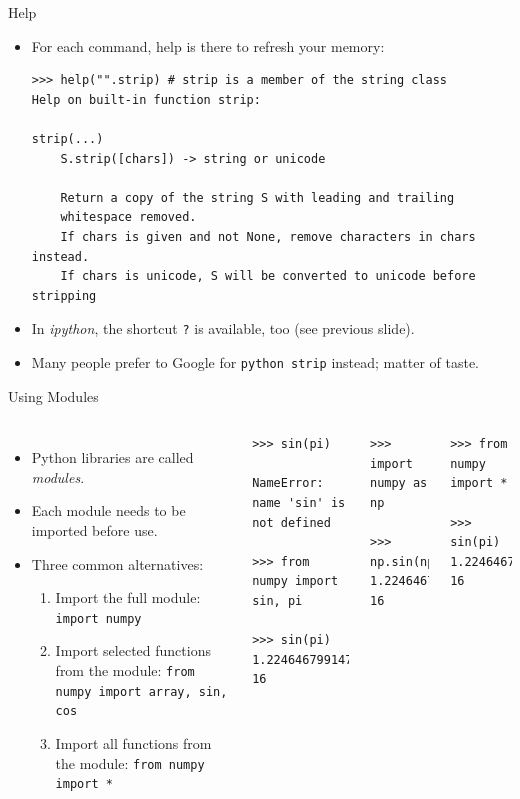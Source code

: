 \documentclass[10pt, aspectratio=169]{beamer} %
\begin{document}
\begin{frame}[fragile,allowframebreaks=0.8]
 {Help}
\begin{itemize}
\item For each command, help is there to refresh your memory:
\begin{lstlisting}
>>> help("".strip) # strip is a member of the string class
Help on built-in function strip:

strip(...)
    S.strip([chars]) -> string or unicode
    
    Return a copy of the string S with leading and trailing
    whitespace removed.
    If chars is given and not None, remove characters in chars instead.
    If chars is unicode, S will be converted to unicode before stripping
\end{lstlisting}
\item In \emph{ipython}, the shortcut \verb+?+ is available, too (see previous slide).
\item Many people prefer to Google for \verb+python strip+ instead; matter of taste.
\end{itemize}
\end{frame}


\begin{frame}[fragile,allowframebreaks=0.8]
 {Using Modules}
\begin{columns}%
\begin{itemize}
\item Python libraries are called \emph{modules}.
\item Each module needs to be imported before use.
\item Three common alternatives:
\begin{enumerate}
	\item Import the full module: \verb+import numpy+
	\item Import selected functions from the module: \verb+from numpy import array, sin, cos+
	\item Import all functions from the module: \verb+from numpy import *+
\end{enumerate}
\end{itemize}

\begin{lstlisting}
>>> sin(pi)

NameError: name 'sin' is not defined

>>> from numpy import sin, pi

>>> sin(pi)
1.2246467991473532e-16
\end{lstlisting}

\begin{lstlisting}
>>> import numpy as np

>>> np.sin(np.pi)
1.2246467991473532e-16
\end{lstlisting}

\begin{lstlisting}
>>> from numpy import *

>>> sin(pi)
1.2246467991473532e-16
\end{lstlisting}

\end{columns}
\end{frame}
\end{document}

